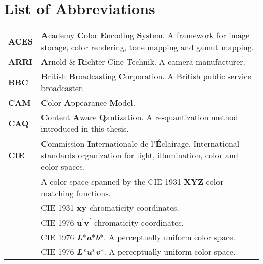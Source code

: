 \chapter*{List of Abbreviations}
%
\begin{flushleft}
%
%
\renewcommand*{\arraystretch}{1.75}
\begin{longtable}[c]{@{}p{28.5mm}@{} p{120.5mm}}
	\textbf{ACES}	& \textbf{A}cademy \textbf{C}olor \textbf{E}ncoding \textbf{S}ystem. A framework for image storage, color rendering, tone mapping and gamut mapping.\\
	\textbf{ARRI}	& \textbf{A}rnold \& \textbf{R}ichter Cine Technik. A camera manufacturer.\\
	\textbf{BBC}    & \textbf{B}ritish \textbf{B}roadcasting \textbf{C}orporation. A British public service broadcaster.\\
	\textbf{CAM}	& \textbf{C}olor \textbf{A}ppearance \textbf{M}odel.\\
	\textbf{CAQ}	& \textbf{C}ontent \textbf{A}ware \textbf{Q}antization. A re-quantization method introduced in this thesis.\\
	\textbf{CIE}	& \textbf{C}ommission \textbf{I}nternationale de l'\textbf{É}clairage. International standards organization for light, illumination, color and color spaces.\\
	\textbf{\XYZ}	& A color space spanned by the CIE 1931 \textbf{XYZ} color matching functions.\\
	\textbf{\xy}	& CIE 1931 \textbf{xy} chromaticity coordinates.\\
	\textbf{\uv}	& CIE 1976 \textbf{u$^\prime$v$^\prime$} chromaticity coordinates.\\
	\textbf{\Lab}	& CIE 1976 \textbf{\textit{L}}*\textbf{\textit{a}}*\textbf{\textit{b}}*. A perceptually uniform color space.\\
	\textbf{\Luv}	& CIE 1976 \textbf{\textit{L}}*\textbf{\textit{u}}*\textbf{\textit{v}}*. A perceptually uniform color space.\\

\end{longtable}
\end{flushleft}
